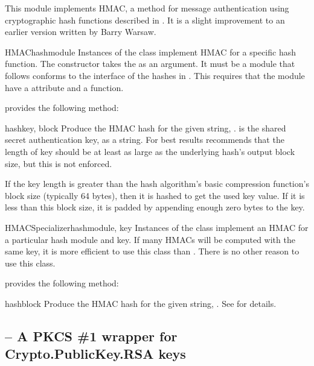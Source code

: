 \documentclass{howto}
\begin{document}
This module implements {HMAC}, a method for message authentication
using cryptographic hash functions described in .  It is a
slight improvement to an earlier version written by Barry Warsaw.

\begin{classdesc}{HMAC}{hashmodule}
Instances of the  class implement HMAC for a specific hash
function.  The constructor takes the  as an argument.
It must be a module that follows conforms to the interface of the
hashes in .  This requires that the module have a
 attribute and a  function.

 provides the following method:

\begin{methoddesc}{hash}{key, block}
Produce the HMAC hash for the given string, .   is
the shared secret authentication key, as a string.  For best results
 recommends that the length of key should be at least as large
as the underlying hash's output block size, but this is not enforced.

If the key length is greater than the hash algorithm's basic
compression function's block size (typically 64 bytes), then it is
hashed to get the used key value.  If it is less than this block
size, it is padded by appending enough zero bytes to the key.
\end{methoddesc}

\end{classdesc}

\begin{classdesc}{HMACSpecializer}{hashmodule, key}
Instances of the  class implement an HMAC for a
particular hash module and key.  If many HMACs will be computed with
the same key, it is more efficient to use this class than
.  There is no other reason to use this class.

 provides the following method:

\begin{methoddesc}{hash}{block}
Produce the HMAC hash for the given string, .  See
 for details.
\end{methoddesc}

\end{classdesc}

\subsection{ 
	-- A PKCS \#1 wrapper for Crypto.PublicKey.RSA keys}
\end{document}
